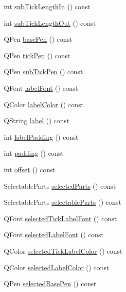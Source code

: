 \begin{DoxyCompactItemize}
\item 
int \hyperlink{class_q_c_p_axis_a052e6ab2ada7e87fa5e5831dcbd4a517}{sub\+Tick\+Length\+In} () const 
\item 
int \hyperlink{class_q_c_p_axis_a091fdf8d1b3f9660e38b854578efb9bc}{sub\+Tick\+Length\+Out} () const 
\item 
Q\+Pen \hyperlink{class_q_c_p_axis_a4f6a7cd46fb104b1dad93e29cc78fe74}{base\+Pen} () const 
\item 
Q\+Pen \hyperlink{class_q_c_p_axis_a5eb206da4265c6c083db71d692da3bc4}{tick\+Pen} () const 
\item 
Q\+Pen \hyperlink{class_q_c_p_axis_a2e8bce6dd03e393dbdf6bb427461a726}{sub\+Tick\+Pen} () const 
\item 
Q\+Font \hyperlink{class_q_c_p_axis_ae8029ae0b32e9d4d73dddcdd0a08c838}{label\+Font} () const 
\item 
Q\+Color \hyperlink{class_q_c_p_axis_a7854c2875e3b8d86b210d108bd87aeb9}{label\+Color} () const 
\item 
Q\+String \hyperlink{class_q_c_p_axis_ab3486dca5a6e9e3ca0e32678272ba549}{label} () const 
\item 
int \hyperlink{class_q_c_p_axis_a59c9a0e362dec811491fc9a0709d2afa}{label\+Padding} () const 
\item 
int \hyperlink{class_q_c_p_axis_abb85015a9467ec176e70698307ec833a}{padding} () const 
\item 
int \hyperlink{class_q_c_p_axis_aebc032ac6eea164a02859c017f52d5e7}{offset} () const 
\item 
Selectable\+Parts \hyperlink{class_q_c_p_axis_a08323248a1cba4750ef07ceea159e0b3}{selected\+Parts} () const 
\item 
Selectable\+Parts \hyperlink{class_q_c_p_axis_ad2bff3d2ed3d35c10d44c0c02441bd2c}{selectable\+Parts} () const 
\item 
Q\+Font \hyperlink{class_q_c_p_axis_ae245bb3dcd0ec71eee38437de6e719f7}{selected\+Tick\+Label\+Font} () const 
\item 
Q\+Font \hyperlink{class_q_c_p_axis_a078bbc88b33595a5308350c2889c96d4}{selected\+Label\+Font} () const 
\item 
Q\+Color \hyperlink{class_q_c_p_axis_a5a3af4bd1a820bb7c6d4c85e1d8d452f}{selected\+Tick\+Label\+Color} () const 
\item 
Q\+Color \hyperlink{class_q_c_p_axis_a8cf8de6ac7f1ca617e05412f669ed229}{selected\+Label\+Color} () const 
\item 
Q\+Pen \hyperlink{class_q_c_p_axis_a5a3919ad7b60c2789b04c7e72387cfd6}{selected\+Base\+Pen} () const 

\end{DoxyCompactItemize}
